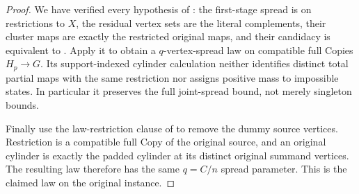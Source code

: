 \begin{proof}
We have verified every hypothesis of :
the first-stage spread is on restrictions to $X$, the residual vertex
sets are the literal complements, their cluster maps are exactly the
restricted original maps, and their candidacy is equivalent to
. Apply it to obtain a $q$-vertex-spread law
on compatible full Copies $H_p\to G$. Its support-indexed cylinder
calculation neither identifies distinct total partial maps with the same
restriction nor assigns positive mass to impossible states. In particular
it preserves the full joint-spread bound, not merely singleton bounds.

Finally use the law-restriction clause of 
to remove the dummy source vertices. Restriction is a compatible full
Copy of the original source, and an original cylinder is exactly the
padded cylinder at its distinct original summand vertices. The resulting
law therefore has the same $q=C/n$ spread parameter. This is the claimed
law on the original instance.
\end{proof}
